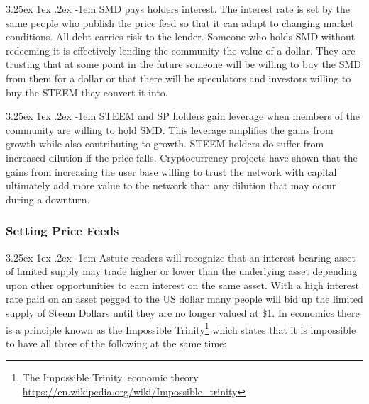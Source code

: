 \documentclass{article}
\makeatletter
\renewcommand\paragraph{\@startsection{paragraph}{5}{\z@}%
  {3.25ex \@plus1ex \@minus.2ex}%
  {-1em}%
  {\normalfont\normalsize\bfseries}}
\makeatother
\begin{document}
                \paragraph{}
                    SMD pays holders interest. The interest rate is set by
the same people who publish the price feed so that it can adapt to changing
market conditions. All debt carries risk to the lender. Someone who holds
SMD without redeeming it is effectively lending the community the value of
a dollar. They are trusting that at some point in the future someone will
be willing to buy the SMD from them for a dollar or that there will be
speculators and investors willing to buy the STEEM they convert it into.

                \paragraph{}
                    STEEM and SP holders gain leverage when members of the
community are willing to hold SMD. This leverage amplifies the gains from
growth while also contributing to growth. STEEM holders do suffer from
increased dilution if the price falls. Cryptocurrency projects have shown
that the gains from increasing the user base willing to trust the network
with capital ultimately add more value to the network than any dilution
that may occur during a downturn.

            \subsubsection{Setting Price Feeds}

                \paragraph{}
                    Astute readers will recognize that an interest bearing
asset of limited supply may trade higher or lower than the underlying asset
depending upon other opportunities to earn interest on the same asset. With
a high interest rate paid on an asset pegged to the US dollar many people
will bid up the limited supply of Steem Dollars until they are no longer
valued at \$1. In economics there is a principle known as the Impossible
Trinity\footnote{The Impossible Trinity, economic theory
\newline\url{https://en.wikipedia.org/wiki/Impossible_trinity}} which
states that it is impossible to have all three of the following at the same
time:
\end{document}
